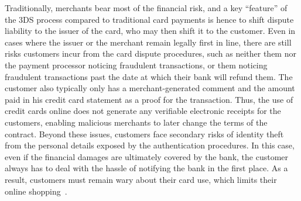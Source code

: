 \documentclass{IEEEtran}
\begin{document}
Traditionally, merchants bear most of the financial risk, and a key
``feature'' of the 3DS process compared to traditional card payments
is hence to shift dispute liability to the issuer of the card, who
may then shift it to the customer.
%
%
Even in cases where the issuer or the merchant remain legally first in
line, there are still risks customers incur from the card dispute
procedures, such as neither them nor the payment processor noticing
fraudulent transactions, or them noticing fraudulent transactions past
the date at which their bank will refund them.  The customer also
typically only has a merchant-generated comment and the amount paid in
his credit card statement as a proof for the transaction.  Thus, the use of
credit cards online does not generate any verifiable electronic
receipts for the customers, enabling malicious merchants to later
change the terms of the contract.  Beyond these issues, customers face
secondary risks of identity theft from the personal details exposed by
the authentication procedures. In this case, even if the financial
damages are ultimately covered by the bank, the customer always has to
deal with the hassle of notifying the bank in the first place.  As a
result, customers must remain wary about their card use, which limits
their online shopping~\cite[p. 50]{ibi2014}.
%



\end{document}
